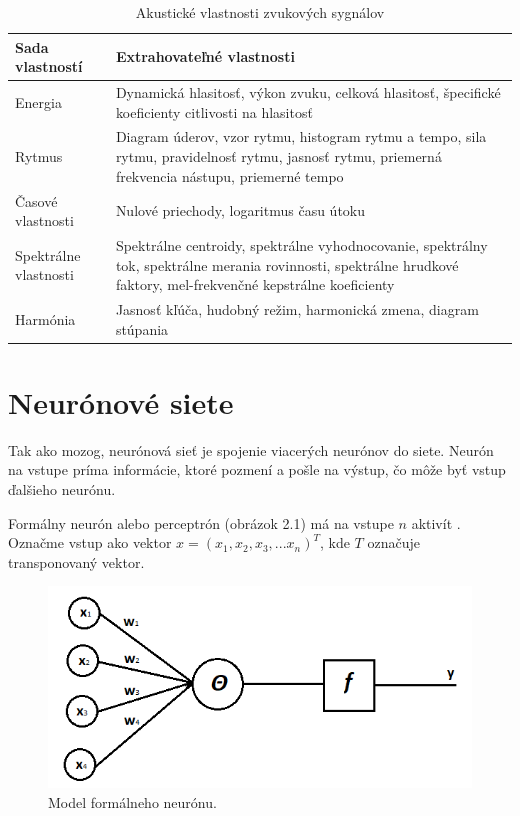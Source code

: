 \begin{table}[]
\centering
\caption{Akustické vlastnosti zvukových sygnálov}
\label{features_table}
\begin{tabular}{l p{10cm}}
\hline
\textbf{Sada vlastností} & \textbf{Extrahovateľné vlastnosti}                                                                                                                                                                             \\ \hline
Energia                  & Dynamická hlasitosť, výkon zvuku, celková hlasitosť, špecifické koeficienty citlivosti na hlasitosť                                                                  \\
Rytmus                   & Diagram úderov, vzor rytmu, histogram rytmu a tempo, sila rytmu, pravidelnosť rytmu, jasnosť rytmu, priemerná frekvencia nástupu, priemerné tempo                  \\
Časové vlastnosti        & Nulové priechody, logaritmus času útoku                                                                                                                                                                        \\
Spektrálne vlastnosti    & Spektrálne centroidy, spektrálne vyhodnocovanie, spektrálny tok, spektrálne merania rovinnosti, spektrálne hrudkové faktory, mel-frekvenčné kepstrálne koeficienty \\
Harmónia                 & Jasnosť kľúča, hudobný režim, harmonická zmena, diagram stúpania                                                                                                     \\ \hline
\end{tabular}
\end{table}

\section{Neurónové siete}
Tak ako mozog, neurónová sieť je spojenie viacerých neurónov do siete.
Neurón na vstupe príma informácie, ktoré pozmení a pošle na výstup, čo môže byť vstup ďalšieho neurónu.

Formálny neurón alebo perceptrón (obrázok 2.1) má na vstupe \(n\) aktivít \cite{NNKvasnicka}.
Označme vstup ako vektor \(x = (x_1, x_2, x_3, ... x_n)^T\), kde \(T\) označuje transponovaný vektor.

\begin{figure}[!ht] 
	\centering 
	\includegraphics[width=.6\textwidth]{figures/perceptron} 
	\caption{Model formálneho neurónu.} 
\end{figure}

